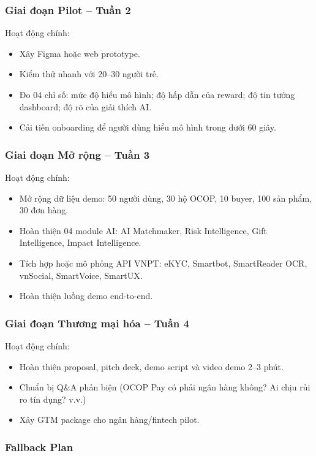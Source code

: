\documentclass[13pt,a4paper]{extarticle}
\begin{document}
\subsubsection{Giai đoạn Pilot -- Tuần 2}

Hoạt động chính:
\begin{itemize}
    \item Xây Figma hoặc web prototype.
    \item Kiểm thử nhanh với 20--30 người trẻ.
    \item Đo 04 chỉ số: mức độ hiểu mô hình; độ hấp dẫn của reward; độ tin tưởng dashboard; độ rõ của giải thích AI.
    \item Cải tiến onboarding để người dùng hiểu mô hình trong dưới 60 giây.
\end{itemize}

\subsubsection{Giai đoạn Mở rộng -- Tuần 3}

Hoạt động chính:
\begin{itemize}
    \item Mở rộng dữ liệu demo: 50 người dùng, 30 hộ OCOP, 10 buyer, 100 sản phẩm, 30 đơn hàng.
    \item Hoàn thiện 04 module AI: AI Matchmaker, Risk Intelligence, Gift Intelligence, Impact Intelligence.
    \item Tích hợp hoặc mô phỏng API VNPT: eKYC, Smartbot, SmartReader OCR, vnSocial, SmartVoice, SmartUX.
    \item Hoàn thiện luồng demo end-to-end.
\end{itemize}

\subsubsection{Giai đoạn Thương mại hóa -- Tuần 4}

Hoạt động chính:
\begin{itemize}
    \item Hoàn thiện proposal, pitch deck, demo script và video demo 2--3 phút.
    \item Chuẩn bị Q\&A phản biện (OCOP Pay có phải ngân hàng không? Ai chịu rủi ro tín dụng? v.v.)
    \item Xây GTM package cho ngân hàng/fintech pilot.
\end{itemize}

\subsubsection{Fallback Plan}
\end{document}
